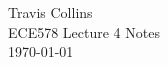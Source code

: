 \documentclass[12pt,letterpaper]{article}
\begin{document}
\linespread{1} %
\small \normalsize %
\begin{flushright}
Travis Collins \\
ECE578 Lecture 4 Notes \\
\today
\end{flushright}
\end{document}
